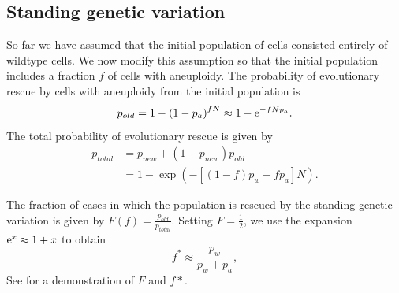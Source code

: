 \documentclass[12pt]{extarticle}
\newcommand{\e}{{\rm e}}
\begin{document}
\subsection*{Standing genetic variation}
So far we have assumed that the initial population of cells consisted entirely of wildtype cells.
We now modify this assumption so that the initial population includes a fraction $f$ of cells with aneuploidy.
The probability of evolutionary rescue by cells with aneuploidy from the initial population is
\begin{equation*}
p_{old} = 1-\left(1-p_a\right)^{fN}\approx 1-\e^{-fNp_a}.
\end{equation*}
The total probability of evolutionary rescue is given by
\begin{align}\nonumber
p_{total} 	&= p_{new}+\left(1-p_{new}\right)p_{old}\\
			&= 1-\exp\left(-\left[\left(1-f\right)p_w + fp_a\right]N\right) .
\end{align}

The fraction of cases in which the population is rescued by the standing genetic variation is given by $F\left(f\right)=\frac{p_{old}}{p_{total}}$.
Setting $F=\frac{1}{2}$, we use the expansion $\e^x \approx 1+x$ to obtain
\begin{equation}\label{halfeqstandvar}
f^*\approx\frac{p_w}{p_w+p_a},
\end{equation}
See  for a demonstration of $F$ and $f*$.

\end{document}

